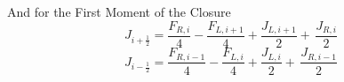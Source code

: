 \noindent
	\indent And for the First Moment of the Closure
\begin{equation}
		J_{i+\frac{1}{2}}=\frac{F_{R,i}}{4}-\frac{F_{L,i+1}}{4}+\frac{J_{L,i+1}}{2}+
		\, \frac{J_{R,i}}{2}
\end{equation}
\begin{equation}
		J_{i-\frac{1}{2}}=\frac{F_{R,i-1}}{4}-\frac{F_{L,i}}{4}+\frac{J_{L,i}}{2}+
		\, \frac{J_{R,i-1}}{2}
\end{equation}

\newpage

 

 